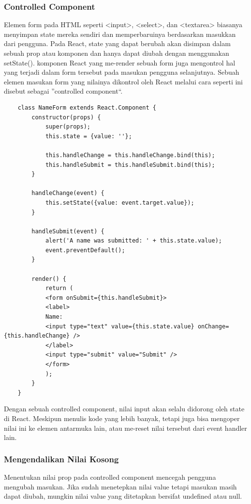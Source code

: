 \subsubsection{Controlled Component}
Elemen form pada HTML seperti <input>, <select>, dan <textarea> biasanya menyimpan state mereka sendiri dan memperbaruinya berdasarkan masukkan dari pengguna. Pada React, state yang dapat berubah akan disimpan dalam sebuah prop atau komponen dan hanya dapat diubah dengan menggunakan setState(). 
komponen React yang me-render sebuah form juga mengontrol hal yang terjadi dalam form tersebut pada masukan pengguna selanjutnya. Sebuah elemen masukan form yang nilainya dikontrol oleh React melalui cara seperti ini disebut sebagai ”controlled component“.
\begin{lstlisting}
	class NameForm extends React.Component {
		constructor(props) {
			super(props);
			this.state = {value: ''};
			
			this.handleChange = this.handleChange.bind(this);
			this.handleSubmit = this.handleSubmit.bind(this);
		}
		
		handleChange(event) {
			this.setState({value: event.target.value});
		}
		
		handleSubmit(event) {
			alert('A name was submitted: ' + this.state.value);
			event.preventDefault();
		}
		
		render() {
			return (
			<form onSubmit={this.handleSubmit}>
			<label>
			Name:
			<input type="text" value={this.state.value} onChange={this.handleChange} />
			</label>
			<input type="submit" value="Submit" />
			</form>
			);
		}
	}
\end{lstlisting}
Dengan sebuah controlled component, nilai input akan selalu didorong oleh state di React. Meskipun menulis kode yang lebih banyak, tetapi juga bisa mengoper nilai ini ke elemen antarmuka lain, atau me-reset nilai tersebut dari event handler lain.
\subsubsection{Mengendalikan Nilai Kosong}
Menentukan nilai prop pada controlled component mencegah pengguna mengubah masukan. Jika sudah menetepkan nilai value tetapi masukan masih dapat diubah, mungkin nilai value yang ditetapkan bersifat undefined atau null.




